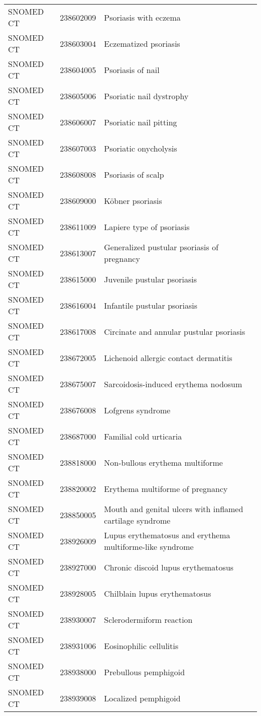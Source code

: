 \begin{longtable}{p{}p{}p{}}
  SNOMED CT & 238602009 & Psoriasis with eczema \\ 
  SNOMED CT & 238603004 & Eczematized psoriasis \\ 
  SNOMED CT & 238604005 & Psoriasis of nail \\ 
  SNOMED CT & 238605006 & Psoriatic nail dystrophy \\ 
  SNOMED CT & 238606007 & Psoriatic nail pitting \\ 
  SNOMED CT & 238607003 & Psoriatic onycholysis \\ 
  SNOMED CT & 238608008 & Psoriasis of scalp \\ 
  SNOMED CT & 238609000 & Köbner psoriasis \\ 
  SNOMED CT & 238611009 & Lapiere type of psoriasis \\ 
  SNOMED CT & 238613007 & Generalized pustular psoriasis of pregnancy \\ 
  SNOMED CT & 238615000 & Juvenile pustular psoriasis \\ 
  SNOMED CT & 238616004 & Infantile pustular psoriasis \\ 
  SNOMED CT & 238617008 & Circinate and annular pustular psoriasis \\ 
  SNOMED CT & 238672005 & Lichenoid allergic contact dermatitis \\ 
  SNOMED CT & 238675007 & Sarcoidosis-induced erythema nodosum \\ 
  SNOMED CT & 238676008 & Lofgrens syndrome \\ 
  SNOMED CT & 238687000 & Familial cold urticaria \\ 
  SNOMED CT & 238818000 & Non-bullous erythema multiforme \\ 
  SNOMED CT & 238820002 & Erythema multiforme of pregnancy \\ 
  SNOMED CT & 238850005 & Mouth and genital ulcers with inflamed cartilage syndrome \\ 
  SNOMED CT & 238926009 & Lupus erythematosus and erythema multiforme-like syndrome \\ 
  SNOMED CT & 238927000 & Chronic discoid lupus erythematosus \\ 
  SNOMED CT & 238928005 & Chilblain lupus erythematosus \\ 
  SNOMED CT & 238930007 & Sclerodermiform reaction \\ 
  SNOMED CT & 238931006 & Eosinophilic cellulitis \\ 
  SNOMED CT & 238938000 & Prebullous pemphigoid \\ 
  SNOMED CT & 238939008 & Localized pemphigoid \\ 

\end{longtable}
